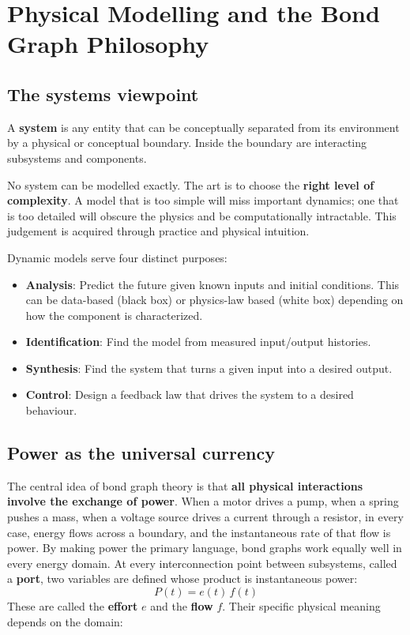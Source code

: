 \chapter{Physical Modelling and the Bond Graph Philosophy}

\section{The systems viewpoint}

A \textbf{system} is any entity that can be conceptually separated from its environment by a physical or conceptual boundary.
Inside the boundary are interacting subsystems and components.

\begin{insightbox}
No system can be modelled exactly. The art is to choose the \textbf{right level of complexity}.
A model that is too simple will miss important dynamics;
one that is too detailed will obscure the physics and be computationally intractable.
This judgement is acquired through practice and physical intuition.
\end{insightbox}

Dynamic models serve four distinct purposes: 
\begin{itemize}
    \item \textbf{Analysis}: Predict the future given known inputs and initial conditions. This can be data-based (black box) or physics-law based (white box) depending on how the component is characterized.
    \item \textbf{Identification}: Find the model from measured input/output histories.
    \item \textbf{Synthesis}: Find the system that turns a given input into a desired output.
    \item \textbf{Control}: Design a feedback law that drives the system to a desired behaviour.
\end{itemize}

\section{Power as the universal currency}

The central idea of bond graph theory is that \textbf{all physical interactions involve the exchange of power}.
When a motor drives a pump, when a spring pushes a mass, when a voltage source drives a current through a resistor, in every case, energy flows across a boundary, and the instantaneous rate of that flow is power.
By making power the primary language, bond graphs work equally well in every energy domain.
At every interconnection point between subsystems, called a \textbf{port}, two variables are defined whose product is instantaneous power:
\begin{equation}
  P(t) = e(t)\,f(t)
\end{equation}
These are called the \textbf{effort} $e$ and the \textbf{flow} $f$.
Their specific physical meaning depends on the domain:

